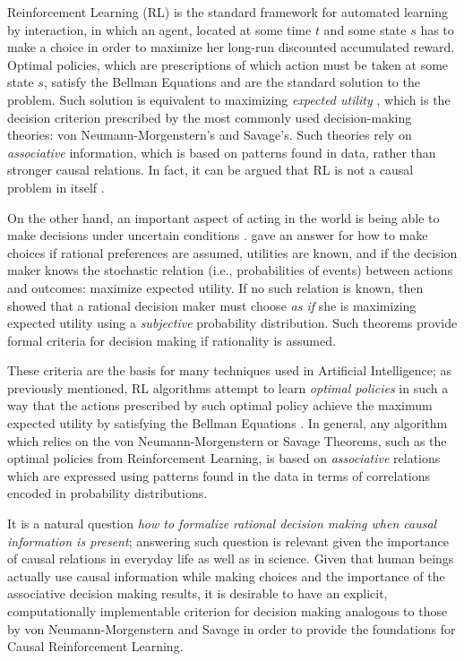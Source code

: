 \documentclass{svjour3}                     %
\begin{document}
Reinforcement Learning (RL) \citep{sutton1998reinforcement} is the standard framework for automated learning by interaction, in which an agent, located at some time $t$ and some state $s$ has to make a choice in order to maximize her long-run discounted accumulated reward. Optimal policies, which are prescriptions of which action must be taken at some state $s$, satisfy the Bellman Equations \citep{Puterman:1994:MDP:528623} and are the standard solution to the problem. Such solution is equivalent to maximizing \textit{expected utility} \citep{webb2007game}, which is the decision criterion prescribed by the most commonly used decision-making theories: von Neumann-Morgenstern's and Savage's. Such theories rely on \textit{associative} information, which is based on patterns found in data, rather than stronger causal relations. In fact, it can be argued that RL is not a causal problem in itself \cite{gonzalezsoto2019reinforcement}.

On the other hand, an important aspect of acting in the world is being able to make decisions under uncertain conditions \citep{bernardo2000bayesian,kahneman2000choices,gilboa2009decision,lake2017building}. \cite{von1944theory} gave an answer for how to make choices if rational preferences are assumed, utilities are known, and if the decision maker knows the stochastic relation (i.e., probabilities of events) between actions and outcomes: maximize expected utility. If no such relation is known, then \cite{savage1954the} showed that a rational decision maker must choose \textit{as if} she is maximizing expected utility using a \textit{subjective} probability distribution. Such theorems provide formal criteria for decision making if rationality is assumed. 

These criteria are the basis for many techniques used in Artificial Intelligence; as previously mentioned, RL algorithms attempt to learn \textit{optimal policies} in such a way that the actions prescribed by such optimal policy achieve the maximum expected utility by satisfying the Bellman Equations \citep{sutton1998reinforcement,webb2007game}. In general, any algorithm which relies on the von Neumann-Morgenstern or Savage Theorems, such as the optimal policies from Reinforcement Learning, is based on \textit{associative} relations which are expressed using patterns found in the data in terms of correlations encoded in probability distributions. 

It is a natural question \textit{how to formalize rational decision making when causal information is present}; answering such question is relevant given the importance of causal relations in everyday life as well as in science. Given that human beings actually use causal information while making choices and the importance of the associative decision making results, it is desirable to have an explicit, computationally implementable criterion for decision making analogous to those by von Neumann-Morgenstern and Savage in order to provide the foundations for Causal Reinforcement Learning.
\end{document}
